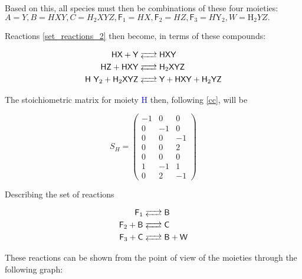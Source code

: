\documentclass{article}
\begin{document}
Based on this, all species must then be combinations of these four moieties:
$A = Y, B = HXY, C = H_2 XYZ, \textsf{F}_1  = HX,
\textsf{F}_2  = HZ, \textsf{F}_3  = H \textrm{Y}_2,
W  = \textrm{H}_2 YZ.$

Reactions \ref{set_reactions_2} then become, in terms of these compounds:

\begin{equation}
\label{cc}
		\begin{split}
		\ce{\textsf{HX} + \textsf{Y} & <--> \textsf{HXY} } \\ 
\ce{\textsf{HZ} + \textsf{HXY} & <--> \textsf{$\textsf{H}_2$XYZ}}	\\
\ce{\textsf{H $\textsf{Y}_2$} +  \textsf{$\textsf{H}_2$XYZ} & <-->  \textsf{Y} + \textsf{HXY} + \textsf{$\textsf{H}_2$YZ}}
		\end{split} 
\end{equation}

The stoichiometric matrix for moiety \textcolor{blue}{H} then, following \ref{cc}, will be

\begin{center}
    \begin{equation}
        S_{H}=\begin{pmatrix}
            -1 & 0 & 0 \\
            0 & -1 & 0 \\
            0 & 0 & -1 \\
            0 & 0 & 2 \\
            0 & 0 & 0 \\
            1 & -1 & 1 \\
            0 & 2 & -1
\end{pmatrix}
    \end{equation}
        \end{center}
Describing the set of reactions

\begin{equation}
		\begin{split}
  \ce{\textsf{F}_1 & <--> \textsf{B} }	\\
  \ce{\textsf{F}_2 + \textsf{B} & <-->  \textsf{C} } \\
  \ce{\textsf{F}_3 + \textsf{C} & <-->  \textsf{B} + \textsf{W} }
		\end{split} 
\end{equation}

These reactions can be shown from the point of view of the moieties through the following graph: \\
\end{document}
